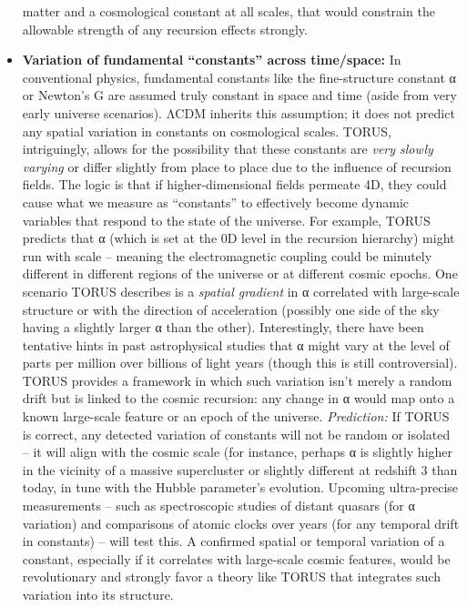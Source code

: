 \documentclass[]{article}
\begin{document}
\begin{itemize}
  matter and a cosmological constant at all scales, that would constrain
  the allowable strength of any recursion effects strongly.
\item
  \textbf{Variation of fundamental ``constants'' across time/space:} In
  conventional physics, fundamental constants like the fine-structure
  constant α or Newton's G are assumed truly constant in space and time
  (aside from very early universe scenarios). ΛCDM inherits this
  assumption; it does not predict any spatial variation in constants on
  cosmological scales. TORUS, intriguingly, allows for the possibility
  that these constants are \emph{very slowly varying} or differ slightly
  from place to place due to the influence of recursion fields. The
  logic is that if higher-dimensional fields permeate 4D, they could
  cause what we measure as ``constants'' to effectively become dynamic
  variables that respond to the state of the universe. For example,
  TORUS predicts that α (which is set at the 0D level in the recursion
  hierarchy) might run with scale -- meaning the electromagnetic
  coupling could be minutely different in different regions of the
  universe or at different cosmic epochs​. One scenario TORUS describes
  is a \emph{spatial gradient} in α correlated with large-scale
  structure or with the direction of acceleration (possibly one side of
  the sky having a slightly larger α than the other)​. Interestingly,
  there have been tentative hints in past astrophysical studies that α
  might vary at the level of parts per million over billions of light
  years (though this is still controversial). TORUS provides a framework
  in which such variation isn't merely a random drift but is linked to
  the cosmic recursion: any change in α would map onto a known
  large-scale feature or an epoch of the universe. \emph{Prediction:} If
  TORUS is correct, any detected variation of constants will not be
  random or isolated -- it will align with the cosmic scale (for
  instance, perhaps α is slightly higher in the vicinity of a massive
  supercluster or slightly different at redshift 3 than today, in tune
  with the Hubble parameter's evolution. Upcoming ultra-precise
  measurements -- such as spectroscopic studies of distant quasars (for
  α variation) and comparisons of atomic clocks over years (for any
  temporal drift in constants) -- will test this​. A confirmed spatial
  or temporal variation of a constant, especially if it correlates with
  large-scale cosmic features, would be revolutionary and strongly favor
  a theory like TORUS that integrates such variation into its structure.

\end{itemize}
\end{document}
